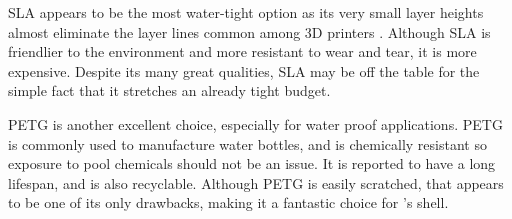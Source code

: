 SLA appears to be the most water-tight option as its very small layer heights almost eliminate the layer lines common among 3D printers \cite{sla}. Although SLA is friendlier to the environment and more resistant to wear and tear, it is more expensive. Despite its many great qualities, SLA may be off the table for the simple fact that it stretches an already tight budget.

PETG is another excellent choice, especially for water proof applications. PETG is commonly used to manufacture water bottles, and is chemically resistant so exposure to pool chemicals should not be an issue. It is reported to have a long lifespan, and is also recyclable. Although PETG is easily scratched, that appears to be one of its only drawbacks, making it a fantastic choice for \juicy’s shell.